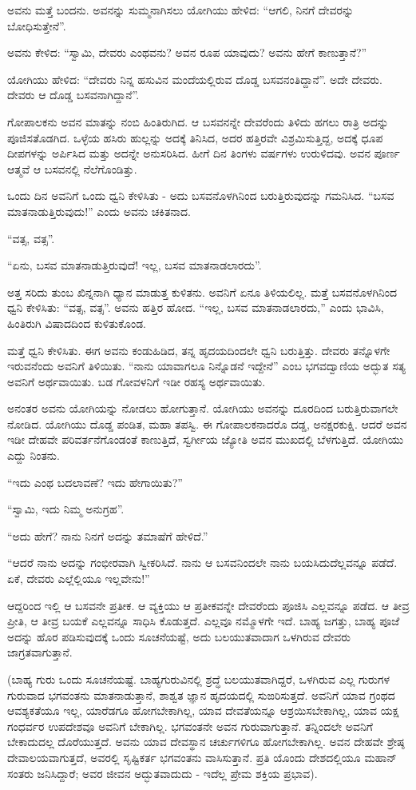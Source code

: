 ಅವನು ಮತ್ತೆ ಬಂದನು. ಅವನನ್ನು ಸುಮ್ಮನಾಗಿಸಲು ಯೋಗಿಯು ಹೇಳಿದ: “ಆಗಲಿ, ನಿನಗೆ ದೇವರನ್ನು ಬೋಧಿಸುತ್ತೇನೆ”.

ಅವನು ಕೇಳಿದ: “ಸ್ವಾಮಿ, ದೇವರು ಎಂಥವನು? ಅವನ ರೂಪ ಯಾವುದು? ಅವನು ಹೇಗೆ ಕಾಣುತ್ತಾನೆ?”

ಯೋಗಿಯು ಹೇಳಿದ: “ದೇವರು ನಿನ್ನ ಹಸುವಿನ ಮಂದೆಯಲ್ಲಿರುವ ದೊಡ್ಡ ಬಸವನಂತಿದ್ದಾನೆ”. ಅದೇ ದೇವರು. ದೇವರು ಆ ದೊಡ್ಡ ಬಸವನಾಗಿದ್ದಾನೆ”.

ಗೋಪಾಲಕನು ಅವನ ಮಾತನ್ನು ನಂಬಿ ಹಿಂತಿರುಗಿದ. ಆ ಬಸವನನ್ನೇ ದೇವರೆಂದು ತಿಳಿದು ಹಗಲು ರಾತ್ರಿ ಅದನ್ನು ಪೂಜಿಸತೊಡಗಿದ. ಒಳ್ಳೆಯ ಹಸಿರು ಹುಲ್ಲನ್ನು ಅದಕ್ಕೆ ತಿನಿಸಿದ, ಅದರ ಹತ್ತಿರವೇ ವಿಶ್ರಮಿಸುತ್ತಿದ್ದ, ಅದಕ್ಕೆ ಧೂಪ ದೀಪಗಳನ್ನು ಅರ್ಪಿಸಿದ ಮತ್ತು ಅದನ್ನೇ ಅನುಸರಿಸಿದ. ಹೀಗೆ ದಿನ ತಿಂಗಳು ವರ್ಷಗಳು ಉರುಳಿದವು. ಅವನ ಪೂರ್ಣ ಆತ್ಮವೆ ಆ ಬಸವನಲ್ಲಿ ನೆಲೆಗೊಂಡಿತ್ತು.

ಒಂದು ದಿನ ಅವನಿಗೆ ಒಂದು ಧ್ವನಿ ಕೇಳಿಸಿತು - ಅದು ಬಸವನೊಳಗಿನಿಂದ ಬರುತ್ತಿರುವುದನ್ನು ಗಮನಿಸಿದ. “ಬಸವ ಮಾತನಾಡುತ್ತಿರುವುದು!” ಎಂದು ಅವನು ಚಕಿತನಾದ.

“ವತ್ಸ, ವತ್ಸ”.

“ಏನು, ಬಸವ ಮಾತನಾಡುತ್ತಿರುವುದೆ! ಇಲ್ಲ, ಬಸವ ಮಾತನಾಡಲಾರದು”.

ಅತ್ತ ಸರಿದು ತುಂಬ ಖಿನ್ನನಾಗಿ ಧ್ಯಾನ ಮಾಡುತ್ತ ಕುಳಿತನು. ಅವನಿಗೆ ಏನೂ ತಿಳಿಯಲಿಲ್ಲ. ಮತ್ತೆ ಬಸವನೊಳಗಿನಿಂದ ಧ್ವನಿ ಕೇಳಿಸಿತು: “ವತ್ಸ, ವತ್ಸ”. ಅವನು ಹತ್ತಿರ ಹೋದ. “ಇಲ್ಲ, ಬಸವ ಮಾತನಾಡಲಾರದು,” ಎಂದು ಭಾವಿಸಿ, ಹಿಂತಿರುಗಿ ವಿಷಾದದಿಂದ ಕುಳಿತುಕೊಂಡ.

ಮತ್ತೆ ಧ್ವನಿ ಕೇಳಿಸಿತು. ಈಗ ಅವನು ಕಂಡುಹಿಡಿದ, ತನ್ನ ಹೃದಯದಿಂದಲೇ ಧ್ವನಿ ಬರುತ್ತಿತ್ತು. ದೇವರು ತನ್ನೊಳಗೇ ಇರುವನೆಂದು ಅವನಿಗೆ ತಿಳಿಯಿತು. “ನಾನು ಯಾವಾಗಲೂ ನಿನ್ನೊಡನೆ ಇದ್ದೇನೆ” ಎಂಬ ಭಗವದ್ವಾಣಿಯ ಅದ್ಭುತ ಸತ್ಯ ಅವನಿಗೆ ಅರ್ಥವಾಯಿತು. ಬಡ ಗೋವಳನಿಗೆ ಇಡೀ ರಹಸ್ಯ ಅರ್ಥವಾಯಿತು.

ಅನಂತರ ಅವನು ಯೋಗಿಯನ್ನು ನೋಡಲು ಹೋಗುತ್ತಾನೆ. ಯೋಗಿಯು ಅವನನ್ನು ದೂರದಿಂದ ಬರುತ್ತಿರುವಾಗಲೇ ನೋಡಿದ. ಯೋಗಿಯು ದೊಡ್ಡ ಪಂಡಿತ, ಮಹಾ ತಪಸ್ವಿ. ಈ ಗೋಪಾಲಕನಾದರೊ ದಡ್ಡ, ಅನಕ್ಷರಕುಕ್ಷಿ. ಆದರೆ ಅವನ ಇಡೀ ದೇಹವೇ ಪರಿವರ್ತನೆಗೊಂಡಂತೆ ಕಾಣುತ್ತಿದೆ, ಸ್ವರ್ಗೀಯ ಜ್ಯೋತಿ ಅವನ ಮುಖದಲ್ಲಿ ಬೆಳಗುತ್ತಿದೆ. ಯೋಗಿಯು ಎದ್ದು ನಿಂತನು.

“ಇದು ಎಂಥ ಬದಲಾವಣೆ? ಇದು ಹೇಗಾಯಿತು?”

“ಸ್ವಾಮಿ, ಇದು ನಿಮ್ಮ ಅನುಗ್ರಹ”.

“ಅದು ಹೇಗೆ? ನಾನು ನಿನಗೆ ಅದನ್ನು ತಮಾಷೆಗೆ ಹೇಳಿದೆ.”

“ಆದರೆ ನಾನು ಅದನ್ನು ಗಂಭೀರವಾಗಿ ಸ್ವೀಕರಿಸಿದೆ. ನಾನು ಆ ಬಸವನಿಂದಲೇ ನಾನು ಬಯಸಿದುದೆಲ್ಲವನ್ನೂ ಪಡೆದೆ. ಏಕೆ, ದೇವರು ಎಲ್ಲೆಲ್ಲಿಯೂ ಇಲ್ಲವೇನು!”

ಆದ್ದರಿಂದ ಇಲ್ಲಿ ಆ ಬಸವನೇ ಪ್ರತೀಕ. ಆ ವ್ಯಕ್ತಿಯು ಆ ಪ್ರತೀಕವನ್ನೇ ದೇವರೆಂದು ಪೂಜಿಸಿ ಎಲ್ಲವನ್ನೂ ಪಡೆದ. ಆ ತೀವ್ರ ಪ್ರೀತಿ, ಆ ತೀವ್ರ ಬಯಕೆ ಎಲ್ಲವನ್ನೂ ಸಾಧಿಸಿ ಕೊಡುತ್ತದೆ. ಎಲ್ಲವೂ ನಮ್ಮೊಳಗೇ ಇದೆ. ಬಾಹ್ಯ ಜಗತ್ತು, ಬಾಹ್ಯ ಪೂಜೆ ಅದನ್ನು ಹೊರ ಪಡಿಸುವುದಕ್ಕೆ ಒಂದು ಸೂಚನೆಯಷ್ಟೆ, ಅದು ಬಲಯುತವಾದಾಗ ಒಳಗಿರುವ ದೇವರು ಜಾಗ್ರತವಾಗುತ್ತಾನೆ.

(ಬಾಹ್ಯ ಗುರು ಒಂದು ಸೂಚನೆಯಷ್ಟೆ. ಬಾಹ್ಯಗುರುವಿನಲ್ಲಿ ಶ್ರದ್ಧೆ ಬಲಯುತವಾಗಿದ್ದರೆ, ಒಳಗಿರುವ ಎಲ್ಲ ಗುರುಗಳ ಗುರುವಾದ ಭಗವಂತನು ಮಾತನಾಡುತ್ತಾನೆ, ಶಾಶ್ವತ ಜ್ಞಾನ ಹೃದಯದಲ್ಲಿ ಸುಙರಿಸುತ್ತದೆ. ಅವನಿಗೆ ಯಾವ ಗ್ರಂಥದ ಆವಶ್ಯಕತೆಯೂ ಇಲ್ಲ, ಯಾರೆಡಗೂ ಹೋಗಬೇಕಾಗಿಲ್ಲ, ಯಾವ ದೇವತೆಯನ್ನೂ ಆಶ್ರಯಿಸಬೇಕಾಗಿಲ್ಲ, ಯಾವ ಯಕ್ಷ ಗಂಧರ್ವರ ಉಪದೇಶವೂ ಅವನಿಗೆ ಬೇಕಾಗಿಲ್ಲ. ಭಗವಂತನೇ ಅವನ ಗುರುವಾಗುತ್ತಾನೆ. ತನ್ನಿಂದಲೇ ಅವನಿಗೆ ಬೇಕಾದುದಲ್ಲ ದೊರೆಯುತ್ತದೆ. ಅವನು ಯಾವ ದೇವಸ್ಥಾನ ಚರ್ಚುಗಳಿಗೂ ಹೋಗಬೇಕಾಗಿಲ್ಲ. ಅವನ ದೇಹವೇ ಶ್ರೇಷ್ಠ ದೇವಾಲಯವಾಗುತ್ತದೆ, ಅವರಲ್ಲಿ ಸೃಷ್ಟಿಕರ್ತ ಭಗವಂತನು ವಾಸಿಸುತ್ತಾನೆ. ಪ್ರತಿ ಯೊಂದು ದೇಶದಲ್ಲಿಯೂ ಮಹಾನ್ ಸಂತರು ಜನಿಸಿದ್ದಾರೆ; ಅವರ ಜೀವನ ಅದ್ಭುತವಾದುದು - ಇದೆಲ್ಲ ಪ್ರೇಮ ಶಕ್ತಿಯ ಪ್ರಭಾವ).

